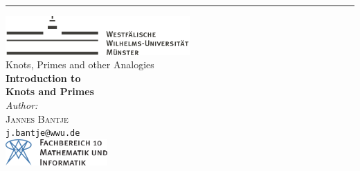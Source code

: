 \begin{titlepage}
\hspace*{0.15\textwidth} %
\rule{2pt}{\textheight} %
\hspace*{0.05\textwidth} %
\begin{minipage}[b]{0.75\textwidth}
	\raggedright
	\includegraphics[height=1.5cm, keepaspectratio]{Bilder/Logo_WWU_Muenster.pdf} \\[2cm]
	{\Large \sffamily Knots, Primes and other Analogies}\\[0.5cm]
	{\Huge\sffamily\bfseries Introduction to\\[1ex] Knots and Primes}\\[7cm]
	{\large \textit{Author:}}\\[5pt]
	{\Large \textsc{Jannes Bantje}}\\[5pt] %
	{\small\nolinkurl{j.bantje@wwu.de}}\\[2.5cm]
	
	\vspace{0.1\textheight}
	\includegraphics[height=1cm, keepaspectratio]{Bilder/fb10logo.pdf}
\end{minipage}	



\end{titlepage}
